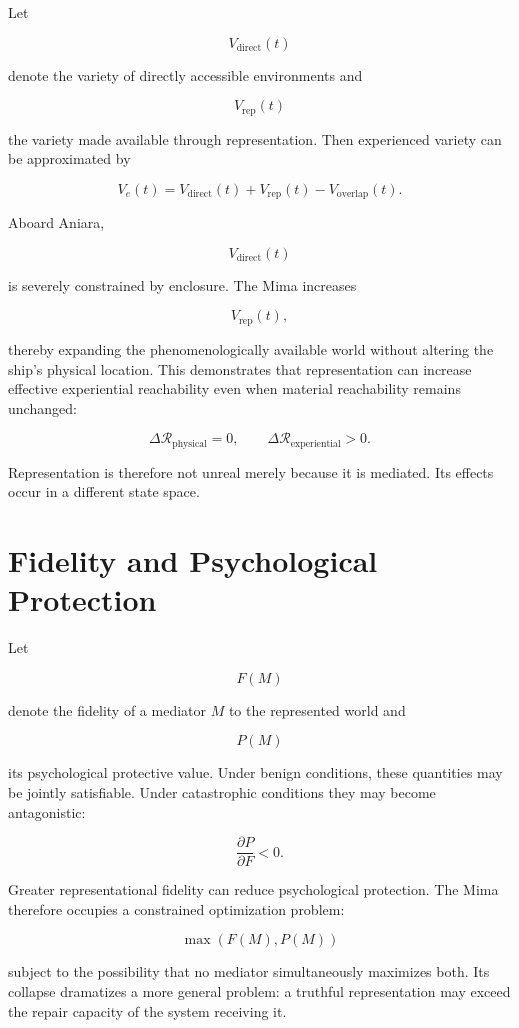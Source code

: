 \documentclass[11pt,oneside]{book}
\theoremstyle{definition}
\theoremstyle{remark}
\begin{document}
Let

\[
V_{\mathrm{direct}}(t)
\]

denote the variety of directly accessible environments and

\[
V_{\mathrm{rep}}(t)
\]

the variety made available through representation. Then experienced variety can be approximated by

\[
V_e(t) = V_{\mathrm{direct}}(t) + V_{\mathrm{rep}}(t) - V_{\mathrm{overlap}}(t).
\]

Aboard Aniara,

\[
V_{\mathrm{direct}}(t)
\]

is severely constrained by enclosure. The Mima increases

\[
V_{\mathrm{rep}}(t),
\]

thereby expanding the phenomenologically available world without altering the ship's physical
location. This demonstrates that representation can increase effective experiential reachability
even when material reachability remains unchanged:

\[
\Delta\mathcal{R}_{\mathrm{physical}}=0, \qquad \Delta\mathcal{R}_{\mathrm{experiential}}>0.
\]

Representation is therefore not unreal merely because it is mediated. Its effects occur in a
different state space.

\section{Fidelity and Psychological Protection}

Let

\[
F(M)
\]

denote the fidelity of a mediator \(M\) to the represented world and

\[
P(M)
\]

its psychological protective value. Under benign conditions, these quantities may be jointly
satisfiable. Under catastrophic conditions they may become antagonistic:

\[
\frac{\partial P}{\partial F}<0.
\]

Greater representational fidelity can reduce psychological protection. The Mima therefore occupies a
constrained optimization problem:

\[
\max \left( F(M),P(M) \right)
\]

subject to the possibility that no mediator simultaneously maximizes both. Its collapse dramatizes a
more general problem: a truthful representation may exceed the repair capacity of the system
receiving it.
\end{document}
